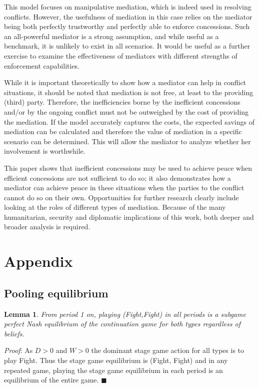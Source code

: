 \documentclass[12pt, letterpaper]{article}
\newtheorem{lemma}{Lemma}
\begin{document}
This model focuses on manipulative mediation, which is indeed used in resolving conflicts. However, the usefulness of mediation in this case relies on the mediator being both perfectly trustworthy and perfectly able to enforce concessions. Such an all-powerful mediator is a strong assumption, and while useful as a benchmark, it is unlikely to exist in all scenarios. It would be useful as a further exercise to examine the effectiveness of mediators with different strengths of enforcement capabilities. 

While it is important theoretically to show how a mediator can help in conflict situations, it should be noted that mediation is not free, at least to the providing (third) party. Therefore, the inefficiencies borne by the inefficient concessions and/or by the ongoing conflict must not be outweighed by the cost of providing the mediation. If the model accurately captures the costs, the expected savings of mediation can be calculated and therefore the value of mediation in a specific scenario can be determined. This will allow the mediator to analyze whether her involvement is worthwhile. 

This paper shows that inefficient concessions may be used to achieve peace when efficient concessions are not sufficient to do so; it also demonstrates how a mediator can achieve peace in these situations when the parties to the conflict cannot do so on their own. Opportunities for further research clearly include looking at the roles of different types of mediation. Because of the many humanitarian, security and diplomatic implications of this work, both deeper and broader analysis is required.

\section{Appendix}


\subsection{Pooling equilibrium}
\begin{lemma}
	From period 1 on, playing (Fight,Fight) in all periods is a subgame perfect Nash equilibrium of the continuation game for both types regardless of beliefs.
	\label{lemma:1}
\end{lemma}
\emph{Proof}: As $D>0$ and $W>0$ the dominant stage game action for all types is to play Fight. Thus the stage game equilibrium is (Fight, Fight) and in any repeated game, playing the stage game equilibrium in each period is an equilibrium of the entire game. \hfill $\blacksquare$\\
\end{document}
